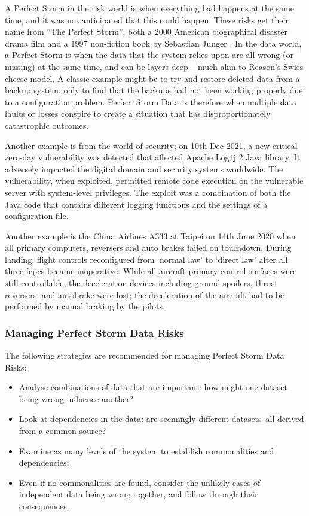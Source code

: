 A Perfect Storm in the risk world is when everything bad happens at the same time,
and it was not anticipated that this could happen.
These risks get their name from “The Perfect Storm”,
both a 2000 American biographical disaster drama film \cite{citation:perfectstorm:website}
and a 1997 non-fiction book by Sebastian Junger \cite{citation:perfectstorm:book}.
In the data world, a Perfect Storm is when the data that the system relies upon are all wrong
(or missing) at the same time, and can be layers deep – much akin to Reason’s Swiss cheese model.
A classic example might be to try and restore deleted data from a backup system,
only to find that the backups had not been working properly due to a configuration problem.
Perfect Storm Data is therefore when multiple data faults or losses conspire to create a
situation that has disproportionately catastrophic outcomes.

Another example is from the world of security;
on 10th Dec 2021, a new critical zero-day vulnerability was detected that affected
Apache Log4j 2 Java library.
It adversely impacted the digital domain and security systems worldwide.
The vulnerability, when exploited, permitted remote code execution on the vulnerable server
with system-level privileges.
The exploit was a combination of both the Java code that contains different logging functions
and the settings of a configuration file.

Another example is the China Airlines A333 at Taipei on 14th June 2020  when all primary computers,
reversers and auto brakes failed on touchdown.
During landing, flight controls reconfigured from ‘normal law’ to ‘direct law’ after all three
\glspl{fcpc} became inoperative.
While all aircraft primary control surfaces were still controllable,
the deceleration devices including ground spoilers, thrust reversers, and autobrake were lost;
the deceleration of the aircraft had to be performed by manual braking by the pilots.

\subsubsection{Managing Perfect Storm Data Risks}
The following strategies are recommended for managing Perfect Storm Data Risks:
\begin{itemize}
\item Analyse combinations of data that are important: how might one \gls{dataset} being wrong influence another?
\item Look at dependencies in the data: are seemingly different \cbstart\glspl{dataset}\cbend\ all derived from a common source?
\item Examine as many levels of the system to establish commonalities and dependencies;
\item Even if no commonalities are found,
consider the unlikely cases of independent data being wrong together,
and follow through their consequences.
\end{itemize}

